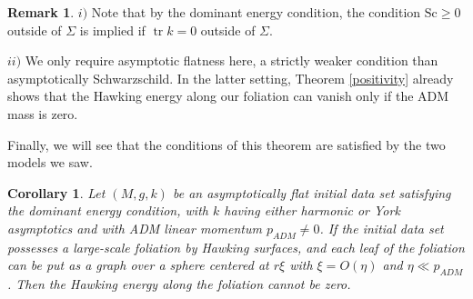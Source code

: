 \documentclass[12pt,a4paper]{amsart}
\theoremstyle{plain}
\newtheorem{corollary}[theorem]{Corollary}
\theoremstyle{definition}
\newtheorem{remark}[theorem]{Remark}
\newcommand{\tr}{\operatorname{tr}}
\begin{document}
\begin{remark}\label{remarkrigidi}
$i)$    Note that by the dominant energy condition, the condition $\mathrm{Sc} \geq 0$ outside of $\Sigma$ is implied if $\tr k=0$ outside of $\Sigma$.

$ii)$ We only require asymptotic flatness here, a strictly weaker condition than asymptotically Schwarzschild. In the latter setting, Theorem \ref{positivity} already shows that the Hawking energy along our foliation can vanish only if the ADM mass is zero.
\end{remark}
 Finally, we will see that the conditions of this theorem are satisfied by the two models we saw. 
 \begin{corollary}\label{rigiharmoyor}
    Let $(M,g,k)$ be an asymptotically flat initial data set satisfying the dominant energy condition, with $k$ having either harmonic or York asymptotics and with ADM linear momentum $p_{ADM} \neq 0$.   If the initial data set possesses a large-scale foliation by  Hawking surfaces, and each leaf of the foliation can be put as a graph over a sphere centered at $r \xi$ with $\xi=O(\eta)$ and $\eta \ll p_{ADM}$. Then the  Hawking energy along the foliation cannot be zero.
\end{corollary}
\end{document}
